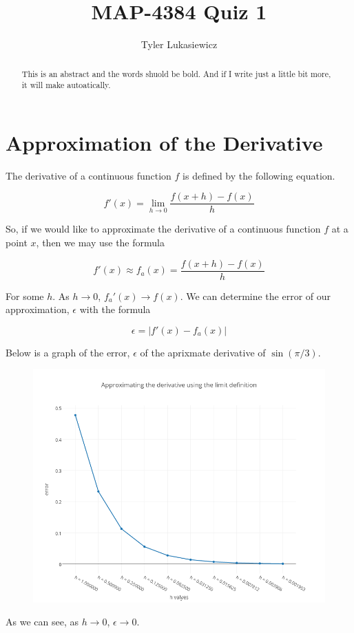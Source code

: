 \documentclass[conference]{IEEEtran}
\title{MAP-4384 Quiz 1}
\author{Tyler Lukasiewicz }
\begin{document}
\maketitle

    \begin{abstract}
        This is an abstract and the words shuold be bold. And if I write just a little bit more, it will make autoatically.
    \end{abstract}
    \section{Approximation of the Derivative}
    \label{sec:Approximation of the Derivative}

        The derivative of a continuous function $f$ is defined by the following equation. 

        \begin{equation}
            f'(x) = \lim _ {h \to 0 } \frac{f(x+h) - f(x)}{h} 
        \end{equation}

        So, if we would like to approximate the derivative of a continuous function $f$ at a point $x$, then we may use the formula

        \begin{equation}
            f'(x) \approx  f_a(x) = \frac{f(x+h) - f(x)}{h} 
        \end{equation}

        For some $h$. As $h \to 0$, $f_a'(x) \to f(x)$. We can determine the error of our approximation,  $\epsilon$ with the formula 

        \begin{equation}
            \epsilon = |f'(x) - f_a(x)|
        \end{equation}

        Below is a graph of the error, $\epsilon$ of the  aprixmate derivative of $\sin (\pi / 3)$.

        \begin{figure}[!ht]
           \begin{center}
               \includegraphics[scale=.50]{graph}
           \end{center}
            \label{fig:1}
        \end{figure}

        As we can see, as $h \to 0$, $\epsilon \to 0$.
\end{document}
